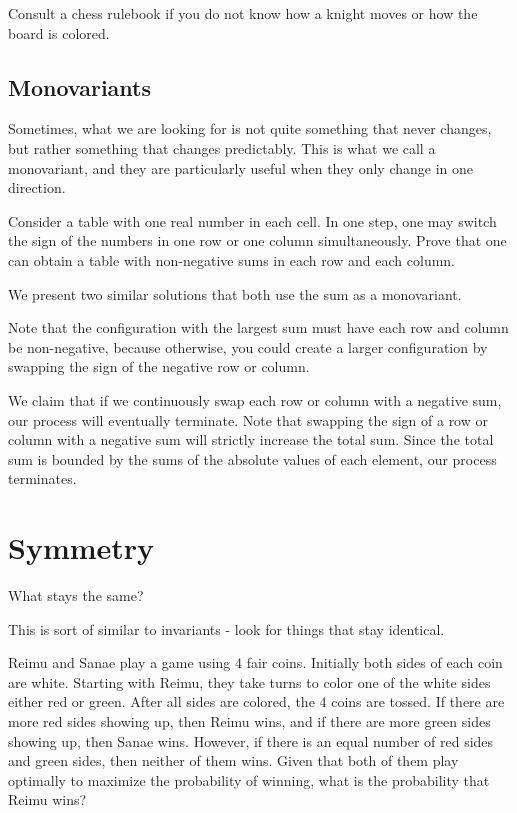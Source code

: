 Consult a chess rulebook if you do not know how a knight moves or how the board is colored.

\subsection{Monovariants}

Sometimes, what we are looking for is not quite something that never changes, but rather something that changes predictably. This is what we call a monovariant, and they are particularly useful when they only change in one direction.

\begin{exam}
Consider a table with one real number in each cell. In one step, one may switch the sign of the numbers in one row or one column simultaneously. Prove that one can obtain a table with non-negative sums in each row and each column.
\end{exam}

We present two similar solutions that both use the sum as a monovariant.

\begin{sol}[1]
Note that the configuration with the largest sum must have each row and column be non-negative, because otherwise, you could create a larger configuration by swapping the sign of the negative row or column.
\end{sol}

\begin{sol}[2]
We claim that if we continuously swap each row or column with a negative sum, our process will eventually terminate. Note that swapping the sign of a row or column with a negative sum will strictly increase the total sum. Since the total sum is bounded by the sums of the absolute values of each element, our process terminates.
\end{sol}

\section{Symmetry}
What stays the same?

This is sort of similar to invariants - look for things that stay identical.

\begin{exam}[HMMT 2019]
Reimu and Sanae play a game using $4$ fair coins. Initially both sides of each coin are white. Starting with Reimu, they take turns to color one of the white sides either red or green. After all sides are colored, the $4$ coins are tossed. If there are more red sides showing up, then Reimu wins, and if there are more green sides showing up, then Sanae wins. However, if there is an equal number of red sides and green sides, then neither of them wins. Given that both of them play optimally to maximize the probability of winning, what is the probability that Reimu wins?
\end{exam}

